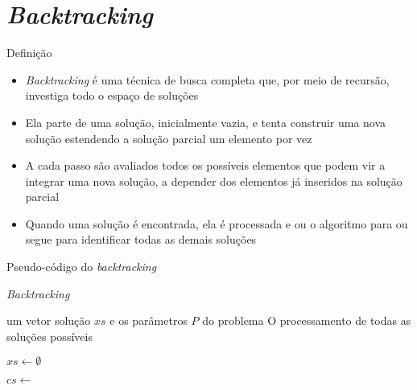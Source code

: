 \section{\it Backtracking}

\begin{frame}[fragile]{Definição}

    \begin{itemize}
        \item \textit{Backtracking} é uma técnica de busca completa que, por meio de recursão,
            investiga todo o espaço de soluções

        \item Ela parte de uma solução, inicialmente vazia, e tenta construir uma nova solução
            estendendo a solução parcial um elemento por vez

        \item A cada passo são avaliados todos os possíveis elementos que podem vir a integrar
            uma nova solução, a depender dos elementos já inseridos na solução parcial

        \item Quando uma solução é encontrada, ela é processada e ou o algoritmo para ou segue
            para identificar todas as demais soluções

    \end{itemize}

\end{frame}

\begin{frame}[fragile]{Pseudo-código do {\it backtracking}}

    \begin{algorithm}[H]
        \caption{\it Backtracking}

        \begin{algorithmic}[1]
            \Require um vetor solução $xs$ e os parâmetros $P$ do problema
            \Ensure O processamento de todas as soluções possíveis

            \State $xs \gets \emptyset$
            \State 
 
                    \State {}
                \Else
                    \State $cs \gets $ 

                        \State {}
                        \State {}
                        \State {}
                        \State {}
                        \State {}
                    \EndFor
                \EndIf
            \EndFunction
        \end{algorithmic}
    \end{algorithm}

\end{frame}

